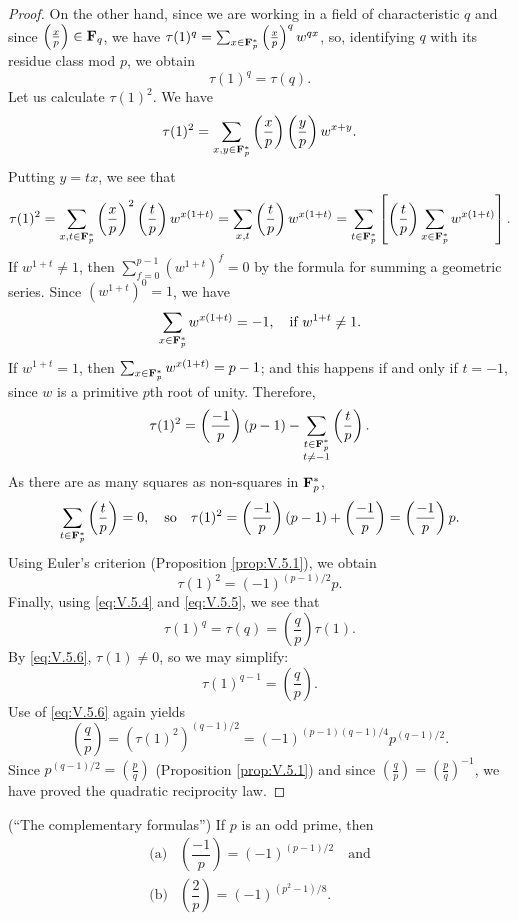 \begin{proof}
On the other hand, since we are working in a field of characteristic $q$ and
since $\left(\frac{x}{p}\right)\in\mathbf{F}_{q}$, we have
$\tau(1)^{q}=\sum_{x\in\mathbf{F}_{p}^{*}}\left(\frac{x}{p}\right)^{q}w^{qx}$, so,
identifying $q$ with its residue class mod $p$, we obtain
\begin{equation}
\tau(1)^{q}=\tau(q).
\label{eq:V.5.5}
\end{equation}
Let us calculate $\tau(1)^{2}$. We have
\[
\tau(1)^{2}=\sum_{x,y\in\mathbf{F}_{p}^{*}}
\left(\frac{x}{p}\right)\left(\frac{y}{p}\right)w^{x+y}.
\]
Putting $y=tx$, we see that
\[
\tau(1)^{2}
=\sum_{x,t\in\mathbf{F}_{p}^{*}}\left(\frac{x}{p}\right)^{2}\left(\frac{t}{p}\right)
w^{x(1+t)}
=\sum_{x,t}\left(\frac{t}{p}\right)w^{x(1+t)}
=\sum_{t\in\mathbf{F}_{p}^{*}}\left[\left(\frac{t}{p}\right)
\sum_{x\in\mathbf{F}_{p}^{*}}w^{x(1+t)}\right].
\]
If $w^{1+t}\neq1$, then $\sum_{f=0}^{p-1}(w^{1+t})^{f}=0$ by the formula for
summing a geometric series. Since $(w^{1+t})^{0}=1$, we have
\[
\sum_{x\in\mathbf{F}_{p}^{*}}w^{x(1+t)}=-1,
\quad\text{if } w^{1+t}\neq1.
\]
If $w^{1+t}=1$, then $\sum_{x\in\mathbf{F}_{p}^{*}}w^{x(1+t)}=p-1$; and this happens
if and only if $t=-1$, since $w$ is a primitive $p$th root of unity.
Therefore,
\[
\tau(1)^{2}=\left(\frac{-1}{p}\right)(p-1)
-\sum_{\substack{t\in\mathbf{F}_{p}^{*}\\t\neq-1}}\left(\frac{t}{p}\right).
\]
As there are as many squares as non-squares in $\mathbf{F}_{p}^{*}$,
\[
\sum_{t\in\mathbf{F}_{p}^{*}}\left(\frac{t}{p}\right)=0,\quad\text{so}\quad
\tau(1)^{2}=\left(\frac{-1}{p}\right)(p-1)+\left(\frac{-1}{p}\right)
=\left(\frac{-1}{p}\right)p.
\]
Using Euler's criterion (Proposition \ref{prop:V.5.1}), we obtain
\begin{equation}
\tau(1)^{2}=(-1)^{(p-1)/2}p.
\label{eq:V.5.6}
\end{equation}
Finally, using \eqref{eq:V.5.4} and \eqref{eq:V.5.5}, we see that
\[
\tau(1)^{q}=\tau(q)=\left(\frac{q}{p}\right)\tau(1).
\]
By \eqref{eq:V.5.6}, $\tau(1)\neq0$, so we may simplify:
\[
\tau(1)^{q-1}=\left(\frac{q}{p}\right).
\]
Use of \eqref{eq:V.5.6} again yields
\[
\left(\frac{q}{p}\right)=(\tau(1)^{2})^{(q-1)/2}
=(-1)^{(p-1)(q-1)/4}p^{(q-1)/2}.
\]
Since $p^{(q-1)/2}=\left(\frac{p}{q}\right)$ (Proposition
\ref{prop:V.5.1}) and since
$\left(\frac{q}{p}\right)=\left(\frac{p}{q}\right)^{-1}$, we have proved the
quadratic reciprocity law.
\end{proof}

\begin{proposition}
\label{prop:V.5.2}
(``The complementary formulas'') If $p$ is an odd prime, then
\[
\begin{array}{ll}
\text{(a)} & \left(\dfrac{-1}{p}\right)=(-1)^{(p-1)/2}\quad\text{and}\\[8pt]
\text{(b)} & \left(\dfrac{2}{p}\right)=(-1)^{(p^{2}-1)/8}.
\end{array}
\]
\end{proposition}

